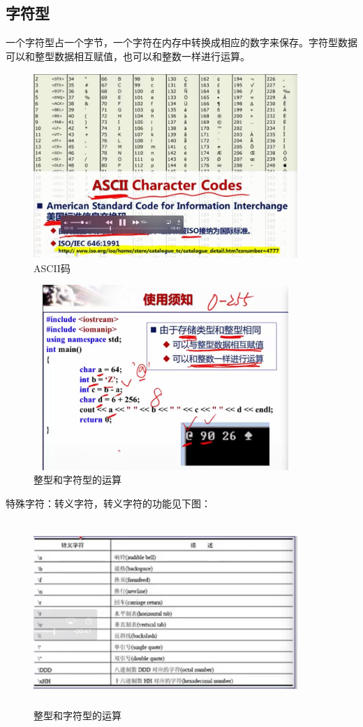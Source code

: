 \documentclass[UTF8]{article}
\begin{document}
\subsection{字符型}
一个字符型占一个字节，一个字符在内存中转换成相应的数字来保存。字符型数据可以和整型数据相互赋值，也可以和整数一样进行运算。
\begin{figure}[!htb]
\centering
\includegraphics[width=10cm,height=7cm]{ascii.jpg}
\caption{ASCII码}
\hspace{0.05in}
\end{figure}

\begin{figure}[!htb]
\centering
\includegraphics[width=10cm,height=7cm]{intandchar.jpg}
\caption{整型和字符型的运算}
\hspace{0.05in}
\end{figure}
特殊字符：转义字符，转义字符的功能见下图：
\begin{figure}[!htb]
\centering
\includegraphics[width=10cm,height=7cm]{zhuanyichar.jpg}
\caption{整型和字符型的运算}
\hspace{0.05in}
\end{figure}
\end{document}
